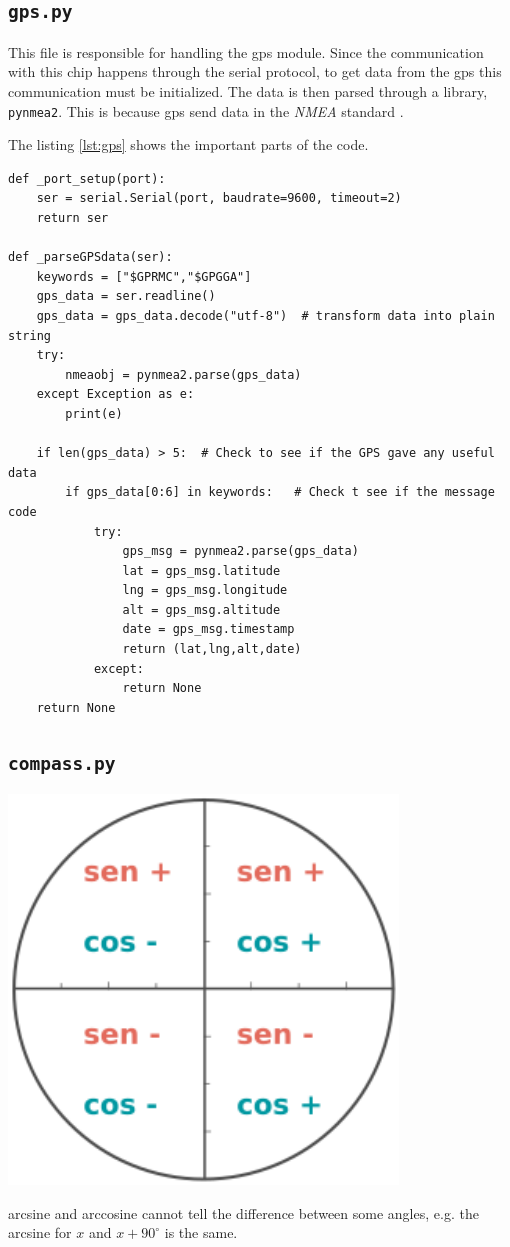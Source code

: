 \documentclass[]{article}
\begin{document}
\subsection{\texttt{gps.py}}
This file is responsible for handling the gps module. Since the communication with this chip happens through the serial protocol, to get data from the gps this communication must be initialized. The data is then parsed through a library, \texttt{pynmea2}. This is because gps send data in the \textit{NMEA} standard \cite{gps_nmea}. 

The listing \ref{lst:gps} shows the important parts of the code.

\begin{lstlisting}[language=PythonPlus, label={lst:gps}, caption=Code for the \texttt{gps.py} file. The serial port initialization and data parsing are shown.]
def _port_setup(port):
	ser = serial.Serial(port, baudrate=9600, timeout=2)
	return ser

def _parseGPSdata(ser):
	keywords = ["$GPRMC","$GPGGA"]
	gps_data = ser.readline()
	gps_data = gps_data.decode("utf-8")  # transform data into plain string
	try:
		nmeaobj = pynmea2.parse(gps_data)
	except Exception as e:
		print(e)

	if len(gps_data) > 5:  # Check to see if the GPS gave any useful data
		if gps_data[0:6] in keywords:   # Check t see if the message code
			try:
				gps_msg = pynmea2.parse(gps_data)
				lat = gps_msg.latitude
				lng = gps_msg.longitude
				alt = gps_msg.altitude 
				date = gps_msg.timestamp
				return (lat,lng,alt,date)
			except:
				return None
	return None
\end{lstlisting}

\subsection{\texttt{compass.py}}

\begin{floatingfigure}[r]{0.35\linewidth}
	\includegraphics[width=0.33\linewidth]{images/software/signe}
	\caption{arcsine and arccosine cannot tell the difference between some angles, e.g. the arcsine for $x$ and $x+90^\circ$ is the same.\\}
\end{floatingfigure}
\end{document}
